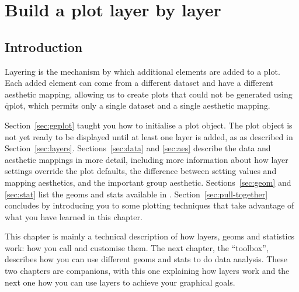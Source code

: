 

% 


\chapter{Build a plot layer by layer}
\label{cha:layers}

\section{Introduction}


Layering is the mechanism by which additional elements are added to a plot.  Each added element can come from a different dataset and have a different aesthetic mapping, allowing us to create plots that could not be generated using \f{qplot}, which permits only a single dataset and a single aesthetic mapping.

Section~\ref{sec:ggplot} taught you how to initialise a plot object. The plot object is not yet ready to be displayed until at least one layer is added, as as described in Section~\ref{sec:layers}. Sections~\ref{sec:data} and \ref{sec:aes} describe the data and aesthetic mappings in more detail, including more information about how layer settings override the plot defaults, the difference between setting values and mapping aesthetics, and the important group aesthetic.  Sections~\ref{sec:geom} and \ref{sec:stat} list the geoms and stats available in \ggplot.  Section~\ref{sec:pull-together} concludes by introducing you to some plotting techniques that take advantage of what you have learned in this chapter.

This chapter is mainly a technical description of how layers, geoms and statistics work: how you call and customise them.  The next chapter, the \ggplot ``toolbox'', describes how you can use different geoms and stats to do data analysis. 
These two chapters are companions, with this one explaining how layers work and the next one how you can use layers to achieve your graphical goals.

